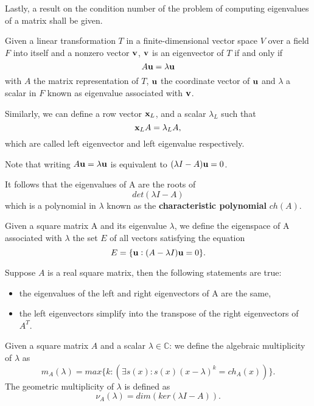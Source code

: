 Lastly, a result on the condition number of the problem
of computing eigenvalues of a matrix shall be given.
\begin{definition}
    Given a linear transformation \(T\) in a finite-dimensional vector space \(V\) over a field \(F\) into itself and a nonzero
    vector
    \(\vb{v}\), \(\vb{v}\) is an eigenvector of \(T\) if and only if
    \[ A \vb{u} = \lambda \vb{u} \]
    with \(A\) the matrix representation of \(T\), \(\vb{u}\) the coordinate vector of \(\vb{u}\) and \(\lambda\) a scalar in
    \(F\) known as eigenvalue associated with \(\vb{v}\).

    Similarly, we can define a row vector \(\vb{x}_{L}\), and a scalar \(\lambda_{L}\) such that
    \[\vb{x}_{L}A = \lambda_{L}A,\]
    which are called left eigenvector and left eigenvalue respectively.
\end{definition}

\begin{remark}
    Note that writing
    \( A \vb{u} = \lambda \vb{u} \) is equivalent to \( (\lambda I - A)\vb{u} = 0 \).

    It follows that the eigenvalues of A are the roots of
    \[ det(\lambda I - A) \]
    which is a polynomial in \(\lambda\) known as the \textbf{characteristic polynomial} \(ch(A)\).
\end{remark}

\begin{definition}[Eigenspace]
    Given a square matrix A and its eigenvalue \(\lambda\), we define the eigenspace of A associated with \(\lambda\) the set \(E\)
    of all vectors satisfying the equation
    \[E = \{\vb{u}: (A - \lambda I)\vb{u} = 0\}.\]
\end{definition}

\begin{remark}
    Suppose \(A\) is a real square matrix, then the following statements are true:
    \begin{itemize}[topsep=0pt, itemsep=0pt, parsep=0pt]
        \item the eigenvalues of the left and right eigenvectors of A are the same,
        \item the left eigenvectors simplify into the transpose of the right eigenvectors of \(A^T\).
    \end{itemize}
\end{remark}

\begin{definition}
    Given a square matrix \(A\) and a scalar \(\lambda \in \mathbb{C}\): we define the algebraic multiplicity of \(\lambda\) as
    \[ m_{A}(\lambda) = max\{k: (\exists s(x): s(x)(x - \lambda)^k = ch_{A}(x))\}.\]
    The geometric multiplicity of \(\lambda\) is defined as
    \[
        \nu_{A}(\lambda) = dim(ker(\lambda I - A)).
    \]
\end{definition}

